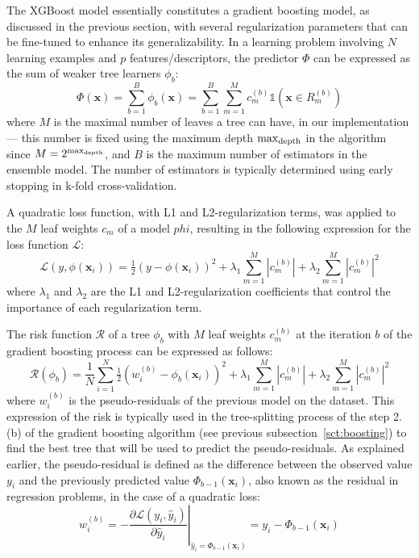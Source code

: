 \documentclass[main]{subfiles}
\begin{document}
The XGBoost model essentially constitutes a gradient boosting model, as discussed in the previous section, with several regularization parameters that can be fine-tuned to enhance its generalizability. In a learning problem involving $N$ learning examples and $p$ features/descriptors, the predictor $\Phi$ can be expressed as the sum of weaker tree learners $\phi_b$:
\begin{equation}
  \Phi(\mathbf{x}) = \sum_{b=1}^{B} \phi_b(\mathbf{x}) = \sum_{b=1}^{B} \sum_{m=1}^{M}c_m^{(b)} \mathbb{1}(\mathbf{x}\in R_m^{(b)})
\end{equation}
where $M$ is the maximal number of leaves a tree can have, in our implementation --- this number is fixed using the maximum depth $\max_{\text{depth}}$ in the algorithm since $M=2^{\max_{\text{depth}}}$, and $B$ is the maximum number of estimators in the ensemble model. The number of estimators is typically determined using early stopping in k-fold cross-validation. 

A quadratic loss function, with L1 and L2-regularization terms, was applied to the $M$ leaf weights $c_m$ of a model $phi$, resulting in the following expression for the loss function $\mathcal{L}$: 
\begin{equation}
  \mathcal{L}\left(y,\phi(\mathbf{x}_i)\right) = \tfrac{1}{2}{\left(y - \phi(\mathbf{x}_i)\right)}^2 + \lambda_1 \sum_{m=1}^{M}\left\lvert{c_m^{(b)}}\right\rvert + \lambda_2 \sum_{m=1}^{M}{\left\lvert{c_m^{(b)}}\right\rvert}^2 
\end{equation}
where $\lambda_1$ and $\lambda_2$ are the L1 and L2-regularization coefficients that control the importance of each regularization term. 

The risk function $\mathcal{R}$ of a tree $\phi_b$ with $M$ leaf weights $c_m^{(b)}$ at the iteration $b$ of the gradient boosting process can be expressed as follows:
\begin{equation}
  \mathcal{R}(\phi_b) = \frac{1}{N}\sum_{i=1}^{N} \tfrac{1}{2}{\left(w_i^{(b)} - \phi_b(\mathbf{x}_i)\right)}^2 + \lambda_1 \sum_{m=1}^{M}\left\lvert{c_m^{(b)}}\right\rvert + \lambda_2 \sum_{m=1}^{M}{\left\lvert{c_m^{(b)}}\right\rvert}^2 
\end{equation}
where $w_i^{(b)}$ is the pseudo-residuals of the previous model on the dataset. This expression of the risk is typically used in the tree-splitting process of the step 2.(b) of the gradient boosting algorithm (see previous subsection~\ref{sct:boosting}) to find the best tree that will be used to predict the pseudo-residuals. As explained earlier, the pseudo-residual is defined as the difference between the observed value $y_i$ and the previously predicted value $\Phi_{b-1}(\mathbf{x}_i)$, also known as the residual in regression problems, in the case of a quadratic loss:
\begin{equation}
  w_i^{(b)} = -\left.\frac{\partial\mathcal{L}\left(y_i,\hat{y}_i\right)}{\partial\hat{y}_i}\right|_{\hat{y}_i=\Phi_{b-1}(\mathbf{x}_i)} = y_i - \Phi_{b-1}(\mathbf{x}_i)
\end{equation}
\end{document}
